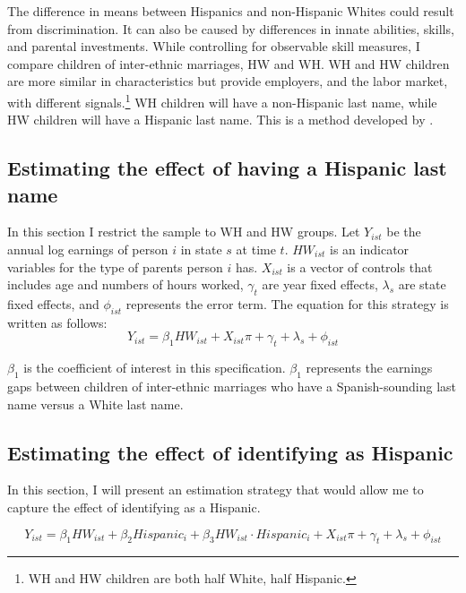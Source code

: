 \documentclass[12pt,english]{article}
\begin{document}
The difference in means between Hispanics and non-Hispanic Whites could result from discrimination. It can also be caused by differences in innate abilities, skills, and parental investments. While controlling for observable skill measures, I compare children of inter-ethnic marriages, HW and WH. WH and HW children are more similar in characteristics but provide employers, and the labor market, with different signals.\footnote{WH and HW children are both half White, half Hispanic.} WH children will have a non-Hispanic last name, while HW children will have a Hispanic last name. This is a method developed by \textcite{rubinstein2014pride}.

\subsection{Estimating the effect of having a Hispanic last name}

In this section I restrict the sample to WH and HW groups. Let $Y_{ist}$ be the annual log earnings of person $i$ in state $s$ at time $t$. $HW_{ist}$ is an indicator variables for the type of parents person $i$ has. $X_{ist}$ is a vector of controls that includes age and numbers of hours worked, $\gamma_{t}$ are year fixed effects, $\lambda_{s}$ are state fixed effects, and $\phi_{ist}$ represents the error term. The equation for this strategy is written as follows:
\begin{equation} \label{eq:1a}
Y_{ist} = \beta_{1} HW_{ist} + X_{ist} \pi + \gamma_{t} + \lambda_s + \phi_{ist}
\end{equation}

$\beta_{1}$ is the coefficient of interest in this specification. $\beta_{1}$ represents the earnings gaps between children of inter-ethnic marriages who have a Spanish-sounding last name versus a White last name. 

\subsection{Estimating the effect of identifying as Hispanic}

In this section, I will present an estimation strategy that would allow me to capture the effect of identifying as a Hispanic. 

\begin{equation} \label{eq:iden}
Y_{ist} = \beta_{1} HW_{ist} + \beta_{2} Hispanic_i + \beta_{3} HW_{ist} \cdot Hispanic_i + X_{ist} \pi + \gamma_{t} + \lambda_s + \phi_{ist}
\end{equation}
\end{document}
